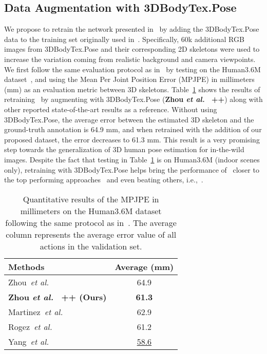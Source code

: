 \documentclass{article}
\begin{document}
\subsection{Data Augmentation with 3DBodyTex.Pose}
\vspace{-0.1cm}
We propose to retrain the network presented in~\cite{zhou2017towards} by adding the 3DBodyTex.Pose data to the training set originally used in~\cite{zhou2017towards}. Specifically, 60k additional RGB images from 3DBodyTex.Pose and their corresponding 2D skeletons were used to increase the variation coming from realistic background and camera viewpoints. \\
We first follow the same evaluation protocol as in~\cite{zhou2017towards} by testing on the Human3.6M dataset~\cite{h36m_pami}, and using the Mean Per Joint Position Error (MPJPE) in millimeters (mm) as an evaluation metric between 3D skeletons.
Table~\ref{tab:h36m_avg_results} shows the results of retraining~\cite{zhou2017towards} by augmenting with 3DBodyTex.Pose (\textbf{Zhou \textit{et al.}~\cite{zhou2017towards} ++}) along with other reported state-of-the-art results as a reference.
 Without using 3DBodyTex.Pose, the average error between the estimated 3D skeleton and the ground-truth annotation is 64.9 mm, and when retrained with the addition of our proposed dataset, the error decreases to 61.3 mm. This result is a very promising step towards the generalization of 3D human pose estimation for in-the-wild images. Despite the fact that testing in Table~\ref{tab:h36m_avg_results} is on Human3.6M (indoor scenes only), retraining with 3DBodyTex.Pose helps bring the performance of~\cite{zhou2017towards} closer to the top performing approaches~\cite{rogez2019lcr,yang20183d} and even beating others, i.e.,~\cite{martinez2017simple}. 
 


\begin{table}[t]
\centering
\begin{tabular}{l|c} 
\hline
Methods & Average (mm)  \\ 
\hline
Zhou~\textit{et al.}~\cite{zhou2017towards}                       &  64.9  
\\
\textbf{Zhou \textit{et al.}~\cite{zhou2017towards} ++ (Ours)}         &  \textbf{61.3}  
\\
\hline
\hline
Martinez~\textit{et al.}~\cite{martinez2017simple}                &  62.9   \\
Rogez~\textit{et al.}~\cite{rogez2019lcr}                         &  61.2   \\
Yang~\textit{et al.}~\cite{yang20183d}                            &  \underline{58.6}   \\
\end{tabular}
\caption{Quantitative results of the MPJPE in millimeters on the Human3.6M dataset following the same protocol as in~\cite{zhou2017towards}. The average column represents the average error value of all actions in the validation set.}
\label{tab:h36m_avg_results}
\end{table}
\end{document}
